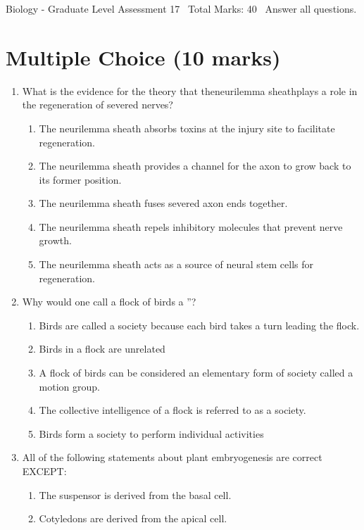 \documentclass[12pt]{article}
\begin{document}
\begin{center}
Biology - Graduate Level Assessment 17 \
Total Marks: 40 \
Answer all questions.
\end{center}

\section*{Multiple Choice (10 marks)}
\begin{enumerate}[label=\arabic*.]
\item What is the evidence for the theory that theneurilemma sheathplays a role in the regeneration of severed nerves?
\begin{enumerate}[label=(\alph*)]
    \item The neurilemma sheath absorbs toxins at the injury site to facilitate regeneration.
    \item The neurilemma sheath provides a channel for the axon to grow back to its former position.
    \item The neurilemma sheath fuses severed axon ends together.
    \item The neurilemma sheath repels inhibitory molecules that prevent nerve growth.
    \item The neurilemma sheath acts as a source of neural stem cells for regeneration.
\end{enumerate}
\item Why would one call a flock of birds a \textquotedblleftsociety\textquotedblright?
\begin{enumerate}[label=(\alph*)]
    \item Birds are called a society because each bird takes a turn leading the flock.
    \item Birds in a flock are unrelated
    \item A flock of birds can be considered an elementary form of society called a motion group.
    \item The collective intelligence of a flock is referred to as a society.
    \item Birds form a society to perform individual activities
\end{enumerate}
\item All of the following statements about plant embryogenesis are correct EXCEPT:
\begin{enumerate}[label=(\alph*)]
    \item The suspensor is derived from the basal cell.
    \item Cotyledons are derived from the apical cell.

\end{enumerate}
\end{enumerate}
\end{document}
